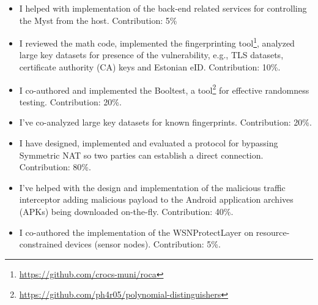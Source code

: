 \documentclass[
  digital, %
  twoside, %
  table,   %
  lof,     %
  lot,     %
]{fithesis3}
\theoremstyle{definition}
\theoremstyle{remark}
\begin{document}
\begin{itemize}
	\item {}
	I helped with implementation of the back-end related services for controlling the Myst from the host. Contribution: 5\%
	
	\item {}
	I reviewed the math code, implemented the fingerprinting tool\footnote{\url{https://github.com/crocs-muni/roca}}, analyzed large key datasets for presence of the vulnerability, e.g., TLS datasets, certificate authority (CA) keys and Estonian eID. Contribution: 10\%. 
	
	\item {}
	I co-authored and implemented the Booltest, a tool\footnote{\url{https://github.com/ph4r05/polynomial-distinguishers}} for effective randomness testing. Contribution: 20\%.
	
	\item {}
	I've co-analyzed large key datasets for known fingerprints. Contribution: 20\%.
	
	\item {}
	I have designed, implemented and evaluated a protocol for bypassing Symmetric NAT so two parties can establish a direct connection. Contribution: 80\%.
	
	\item {}
	I've helped with the design and implementation of the malicious traffic interceptor adding malicious payload to the Android application archives (APKs) being downloaded on-the-fly. Contribution: 40\%.
	
	\item {}
	I co-authored the implementation of the WSNProtectLayer on resource-constrained devices (sensor nodes). Contribution: 5\%.
\end{itemize}
\end{document}

